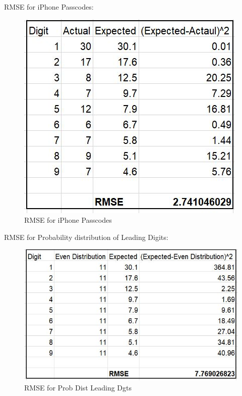 RMSE for iPhone Passcodes:
\begin{figure}[!ht]
\centering\includegraphics[width=\columnwidth]{images/rmse_iphone_cd.JPG}
  \caption{RMSE for iPhone Passcodes}\label{f:rmse-iphone-cd}
\end{figure}

RMSE for Probability distribution of Leading Digits:

\begin{figure}[!ht]
\centering\includegraphics[width=\columnwidth]{images/rmse_prob_dist.JPG}
  \caption{RMSE for Prob Dist Leading Dgts}\label{f:rmse-prob-dgt}
\end{figure}

